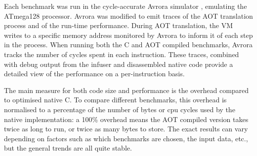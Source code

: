 Each benchmark was run in the cycle-accurate Avrora simulator \cite{Titzer:2005vb}, emulating the ATmega128 processor. Avrora was modified to emit traces of the AOT translation process and of the run-time performance. During AOT translation, the VM writes to a specific memory address monitored by Avrora to inform it of each step in the process. When running both the C and AOT compiled benchmarks, Avrora tracks the number of cycles spent in each instruction. These traces, combined with debug output from the infuser and disassembled native code provide a detailed view of the performance on a per-instruction basis.

The main measure for both code size and performance is the overhead compared to optimised native C. To compare different benchmarks, this overhead is normalised to a percentage of the number of bytes or cpu cycles used by the native implementation: a 100\% overhead means the AOT compiled version takes twice as long to run, or twice as many bytes to store. The exact results can vary depending on factors such as which benchmarks are chosen, the input data, etc., but the general trends are all quite stable.

